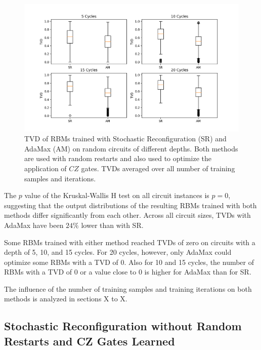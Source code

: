 \begin{figure}[H]
  \centering
  \includegraphics[width=\textwidth]{figures/sr_vs_am.png}
  \caption[Comparison of Stochastic Reconfiguration and AdaMax]{TVD of RBMs trained with 
  Stochastic Reconfiguration (SR) and AdaMax (AM) on random circuits of different depths. Both methods are used with random restarts and also 
  used to optimize the application of $CZ$ gates. TVDs averaged over all number of training samples 
  and iterations.}
  \label{fig:sr_am}
\end{figure}

The $p$ value of the Kruskal-Wallis H test on all circuit instances is $p=0$, suggesting that 
the output distributions of the resulting RBMs trained with both methods differ significantly from
each other. Across all circuit sizes, TVDs with AdaMax have been $24\%$ lower than with SR. 

Some RBMs trained with either method reached TVDs of zero on circuits with a depth of 5, 10, and 15 cycles.
For 20 cycles, however, only AdaMax could optimize some RBMs with a TVD of 0. Also for 10 and 15 cycles, 
the number of RBMs with a TVD of 0 or a value close to 0 is higher for AdaMax than for SR.

The influence of the number of training samples and training iterations on both methods is analyzed in 
sections X to X.
\fi
\subsection{Stochastic Reconfiguration without Random Restarts and CZ Gates Learned}

